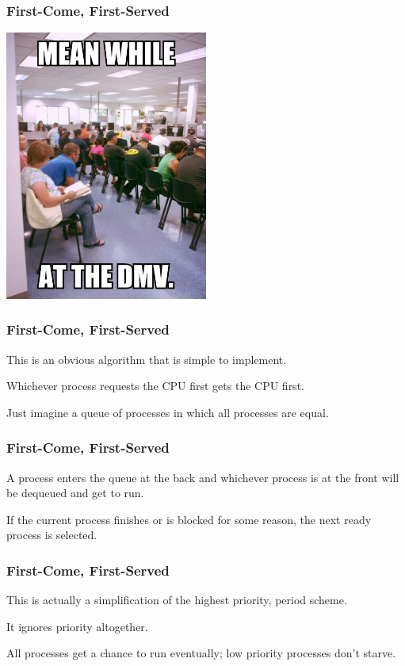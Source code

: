 \begin{frame}
\frametitle{First-Come, First-Served}

\begin{center}
	\includegraphics[width=0.5\textwidth]{images/dmv.jpg}
\end{center}


\end{frame}


\begin{frame}
\frametitle{First-Come, First-Served}

This is an obvious algorithm that is simple to implement. 

Whichever process requests the CPU first gets the CPU first. 

Just imagine a queue of processes in which all processes are equal. 


\end{frame}


\begin{frame}
\frametitle{First-Come, First-Served}


A process enters the queue at the back and whichever process is at the front will be dequeued and get to run.  

If the current process finishes or is blocked for some reason, the next ready process is selected. 


\end{frame}



\begin{frame}
\frametitle{First-Come, First-Served}

This is actually a simplification of the highest priority, period scheme.

It ignores priority altogether. 

All processes get a chance to run eventually; low priority processes don't starve.


\end{frame}

